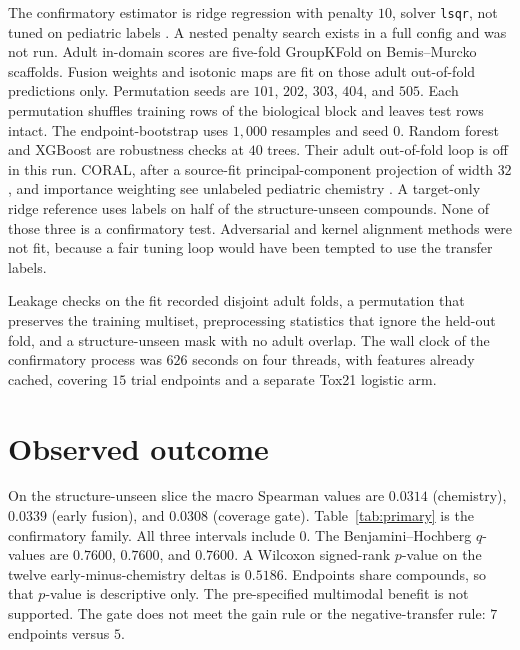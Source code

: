\documentclass[10pt]{article}
\begin{document}
The confirmatory estimator is ridge regression with penalty $10$, solver \texttt{lsqr}, not tuned on pediatric labels \citep{hoerl1970ridge}.
A nested penalty search exists in a full config and was not run.
Adult in-domain scores are five-fold GroupKFold on Bemis--Murcko scaffolds.
Fusion weights and isotonic maps are fit on those adult out-of-fold predictions only.
Permutation seeds are $101$, $202$, $303$, $404$, and $505$.
Each permutation shuffles training rows of the biological block and leaves test rows intact.
The endpoint-bootstrap uses $1{,}000$ resamples and seed $0$.
Random forest and XGBoost are robustness checks at $40$ trees.
Their adult out-of-fold loop is off in this run.
CORAL, after a source-fit principal-component projection of width $32$, and importance weighting see unlabeled pediatric chemistry \citep{sun2016coral}.
A target-only ridge reference uses labels on half of the structure-unseen compounds.
None of those three is a confirmatory test.
Adversarial and kernel alignment methods were not fit, because a fair tuning loop would have been tempted to use the transfer labels.

Leakage checks on the fit recorded disjoint adult folds, a permutation that preserves the training multiset, preprocessing statistics that ignore the held-out fold, and a structure-unseen mask with no adult overlap.
The wall clock of the confirmatory process was $626$ seconds on four threads, with features already cached, covering $15$ trial endpoints and a separate Tox21 logistic arm.

\section{Observed outcome}
\label{sec:results}

On the structure-unseen slice the macro Spearman values are $0.0314$ (chemistry), $0.0339$ (early fusion), and $0.0308$ (coverage gate).
Table~\ref{tab:primary} is the confirmatory family.
All three intervals include $0$.
The Benjamini--Hochberg $q$-values are $0.7600$, $0.7600$, and $0.7600$.
A Wilcoxon signed-rank $p$-value on the twelve early-minus-chemistry deltas is $0.5186$.
Endpoints share compounds, so that $p$-value is descriptive only.
The pre-specified multimodal benefit is not supported.
The gate does not meet the gain rule or the negative-transfer rule: $7$ endpoints versus $5$.
\end{document}

